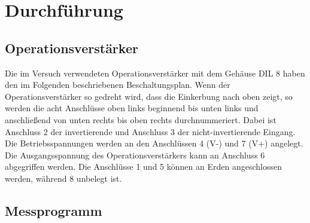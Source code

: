  \section{Durchführung}
\label{sec:Durchführung}

\subsection{Operationsverstärker}

Die im Versuch verwendeten Operationsverstärker mit dem Gehäuse DIL 8 haben den im Folgenden
beschriebenen Beschaltungsplan. Wenn der Operationsverstärker so gedreht wird, dass die Einkerbung
nach oben zeigt, so werden die acht Anschlüsse oben links beginnend bis unten links und anschließend
von unten rechts bis oben rechts durchnummeriert. Dabei ist Anschluss 2 der invertierende und
Anschluss 3 der nicht-invertierende Eingang. Die Betriebsspannungen werden an den Anschlüssen 4 (V-) und 7 (V+)
angelegt. Die Ausgangsspannung des Operationsverstärkers kann an Anschluss 6 abgegriffen werden. Die Anschlüsse
1 und 5 können an Erden angeschlossen werden, während 8 unbelegt ist.


\subsection{Messprogramm}

